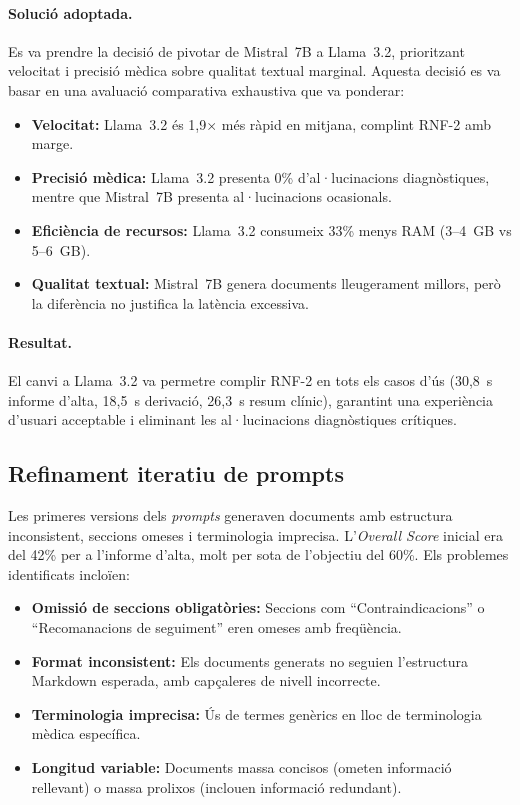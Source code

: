 \documentclass[CAT]{TFUOC}%
\begin{document}
\paragraph{Solució adoptada.}
Es va prendre la decisió de pivotar de Mistral~7B a Llama~3.2, prioritzant velocitat i precisió mèdica sobre qualitat textual marginal. Aquesta decisió es va basar en una avaluació comparativa exhaustiva que va ponderar:

\begin{itemize}
    \item \textbf{Velocitat:} Llama~3.2 és 1,9$\times$ més ràpid en mitjana, complint RNF-2 amb marge.
    \item \textbf{Precisió mèdica:} Llama~3.2 presenta 0\% d'al·lucinacions diagnòstiques, mentre que Mistral~7B presenta al·lucinacions ocasionals.
    \item \textbf{Eficiència de recursos:} Llama~3.2 consumeix 33\% menys RAM (3--4~GB vs 5--6~GB).
    \item \textbf{Qualitat textual:} Mistral~7B genera documents lleugerament millors, però la diferència no justifica la latència excessiva.
\end{itemize}

\paragraph{Resultat.}
El canvi a Llama~3.2 va permetre complir RNF-2 en tots els casos d'ús (30,8~s informe d'alta, 18,5~s derivació, 26,3~s resum clínic), garantint una experiència d'usuari acceptable i eliminant les al·lucinacions diagnòstiques crítiques.

\subsection{Refinament iteratiu de prompts}

Les primeres versions dels \textit{prompts} generaven documents amb estructura inconsistent, seccions omeses i terminologia imprecisa. L'\textit{Overall Score} inicial era del 42\% per a l'informe d'alta, molt per sota de l'objectiu del 60\%. Els problemes identificats incloïen:

\begin{itemize}
    \item \textbf{Omissió de seccions obligatòries:} Seccions com ``Contraindicacions'' o ``Recomanacions de seguiment'' eren omeses amb freqüència.
    \item \textbf{Format inconsistent:} Els documents generats no seguien l'estructura Markdown esperada, amb capçaleres de nivell incorrecte.
    \item \textbf{Terminologia imprecisa:} Ús de termes genèrics en lloc de terminologia mèdica específica.
    \item \textbf{Longitud variable:} Documents massa concisos (ometen informació rellevant) o massa prolixos (inclouen informació redundant).
\end{itemize}
\end{document}

